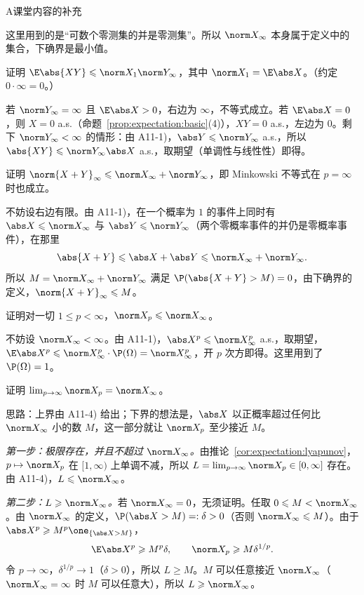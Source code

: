 \begin{exercises}{A}{课堂内容的补充}
\begin{questions}
\begin{solution}
这里用到的是“可数个零测集的并是零测集”。所以 $\norm X_\infty$ 本身属于定义中的集合，下确界是最小值。
\end{solution}
\item 证明 $\E\abs{XY}\leqslant\norm X_1\norm Y_\infty$，其中 $\norm X_1=\E\abs X$。（约定 $0\cdot\infty=0$。）
\begin{solution}
若 $\norm Y_\infty=\infty$ 且 $\E\abs X>0$，右边为 $\infty$，不等式成立。若 $\E\abs X=0$，则 $X=0$ a.s.（命题~\ref{prop:expectation:basic}(4)），$XY=0$ a.s.，左边为 $0$。剩下 $\norm Y_\infty<\infty$ 的情形：由 A11-1)，$\abs Y\leqslant\norm Y_\infty$ a.s.，所以 $\abs{XY}\leqslant\norm Y_\infty\abs X$ a.s.，取期望（单调性与线性性）即得。
\end{solution}
\item 证明 $\norm{X+Y}_\infty\leqslant\norm X_\infty+\norm Y_\infty$，即 Minkowski 不等式在 $p=\infty$ 时也成立。
\begin{solution}
不妨设右边有限。由 A11-1)，在一个概率为 $1$ 的事件上同时有 $\abs X\leqslant\norm X_\infty$ 与 $\abs Y\leqslant\norm Y_\infty$（两个零概率事件的并仍是零概率事件），在那里
\[
\abs{X+Y}\leqslant\abs X+\abs Y\leqslant\norm X_\infty+\norm Y_\infty .
\]
所以 $M=\norm X_\infty+\norm Y_\infty$ 满足 $\P(\abs{X+Y}>M)=0$，由下确界的定义，$\norm{X+Y}_\infty\leqslant M$。
\end{solution}
\item 证明对一切 $1\leqslant p<\infty$，$\norm X_p\leqslant\norm X_\infty$。
\begin{solution}
不妨设 $\norm X_\infty<\infty$。由 A11-1)，$\abs X^p\leqslant\norm X_\infty^p$ a.s.，取期望，$\E\abs X^p\leqslant\norm X_\infty^p\cdot \P(\Omega)=\norm X_\infty^p$，开 $p$ 次方即得。这里用到了 $\P(\Omega)=1$。
\end{solution}
\end{questions}

\item\label{ex:expectation:A12} 证明 $\lim_{p\to\infty}\norm X_p=\norm X_\infty$。
\begin{solution}
思路：上界由 A11-4) 给出；下界的想法是，$\abs X$ 以正概率超过任何比 $\norm X_\infty$ 小的数 $M$，这一部分就让 $\norm X_p$ 至少接近 $M$。

\emph{第一步：极限存在，并且不超过 $\norm X_\infty$。}由推论~\ref{cor:expectation:lyapunov}，$p\mapsto\norm X_p$ 在 $[1,\infty)$ 上单调不减，所以 $L=\lim_{p\to\infty}\norm X_p\in[0,\infty]$ 存在。由 A11-4)，$L\leqslant\norm X_\infty$。

\emph{第二步：$L\geqslant\norm X_\infty$。}若 $\norm X_\infty=0$，无须证明。任取 $0\leqslant M<\norm X_\infty$。由 $\norm X_\infty$ 的定义，$\P(\abs X>M)=:\delta>0$（否则 $\norm X_\infty\leqslant M$）。由于 $\abs X^p\geqslant M^p\one_{\{\abs X>M\}}$，
\[
\E\abs X^p\geqslant M^p\delta,\qquad\norm X_p\geqslant M\delta^{1/p}.
\]
令 $p\to\infty$，$\delta^{1/p}\to1$（$\delta>0$），所以 $L\geqslant M$。$M$ 可以任意接近 $\norm X_\infty$（$\norm X_\infty=\infty$ 时 $M$ 可以任意大），所以 $L\geqslant\norm X_\infty$。


\end{solution}
\end{exercises}
